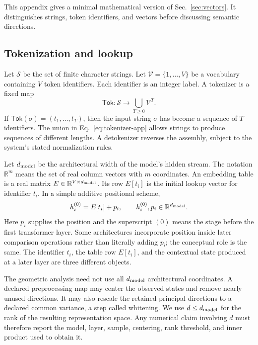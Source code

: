 \documentclass[
  aps,
  reprint,
  superscriptaddress,
  floatfix,
  nofootinbib,
  longbibliography
]{revtex4-2}
\newcommand{\R}{\mathbb{R}}
\begin{document}
This appendix gives a minimal mathematical version of
Sec.~\ref{sec:vectors}.  It distinguishes strings, token identifiers, and
vectors before discussing semantic directions.

\subsection{Tokenization and lookup}

Let $\mathcal S$ be the set of finite character strings.  Let
$\mathcal V=\{1,\ldots,V\}$ be a vocabulary containing $V$ token identifiers.
Each identifier is an integer label.  A tokenizer is a fixed map
\begin{equation}
 \mathsf{Tok}:\mathcal S\longrightarrow
 \bigcup_{T\geq0}\mathcal V^T.
 \label{eq:tokenizer-app}
\end{equation}
If $\mathsf{Tok}(\sigma)=(t_1,\ldots,t_T)$, then the input string $\sigma$
has become a sequence of $T$ identifiers.  The union in
Eq.~\eqref{eq:tokenizer-app} allows strings to produce sequences of different
lengths.  A detokenizer reverses the assembly, subject to the system's stated
normalization rules.

Let $d_{\rm model}$ be the architectural width of the model's hidden stream.
The notation $\R^m$ means the set of real column vectors with $m$ coordinates.
An embedding table is a real matrix
$E\in\R^{V\times d_{\rm model}}$.  Its row $E[t_i]$ is the initial lookup
vector for identifier $t_i$.  In a simple additive positional scheme,
\begin{equation}
 h_i^{(0)}=E[t_i]+p_i,
 \qquad h_i^{(0)},p_i\in\R^{d_{\rm model}}.
 \label{eq:lookup-app}
\end{equation}
Here $p_i$ supplies the position and the superscript $(0)$ means the stage
before the first transformer layer.  Some architectures incorporate position
inside later comparison operations rather than literally adding $p_i$; the
conceptual role is the same.  The identifier $t_i$, the table row $E[t_i]$, and the
contextual state produced at a later layer are three different objects.

The geometric analysis need not use all $d_{\rm model}$ architectural
coordinates.  A declared preprocessing map may center the observed states and
remove nearly unused directions.  It may also rescale the retained principal
directions to a declared common variance, a step called whitening.  We use
$d\leq d_{\rm model}$ for the rank of the resulting representation space.
Any numerical claim involving $d$ must therefore report the model,
layer, sample, centering, rank threshold, and inner product used to obtain it.
\end{document}
